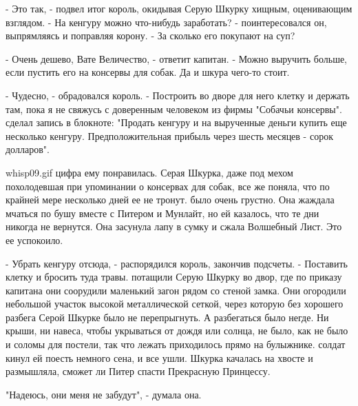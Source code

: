 \par- Это так, - подвел итог король, окидывая Серую Шкурку хищным, 
оценивающим взглядом. - На кенгуру можно что-нибудь заработать? - 
поинтересовался он, выпрямляясь и поправляя корону. - За сколько его 
покупают на суп?
\par- Очень дешево, Вате Величество, - ответит капитан. - Можно 
выручить больше, если пустить его на консервы для собак. Да и шкура 
чего-то стоит.
\par- Чудесно, - обрадовался король. - Построить во дворе для него 
клетку и держать там, пока я не свяжусь с доверенным человеком из 
фирмы "Собачьи консервы".
 сделал запись в блокноте: "Продать кенгуру и на вырученные 
деньги купить еще несколько кенгуру. Предположительная прибыль через 
шесть месяцев - сорок долларов".
\par{whisp09.gif}
 цифра ему понравилась. Серая Шкурка, даже под мехом 
похолодевшая при упоминании о консервах для собак, все же поняла, что 
по крайней мере несколько дней ее не тронут.
 было очень грустно. Она жаждала мчаться по бушу вместе с 
Питером и Мунлайт, но ей казалось, что те дни никогда не вернутся. Она 
засунула лапу в сумку и сжала Волшебный Лист. Это ее успокоило.
\par- Убрать кенгуру отсюда, - распорядился король, закончив подсчеты. 
- Поставить клетку и бросить туда травы.
 потащили Серую Шкурку во двор, где по приказу капитана они 
соорудили маленький загон рядом со стеной замка. Они огородили 
небольшой участок высокой металлической сеткой, через которую без 
хорошего разбега Серой Шкурке было не перепрыгнуть. А разбегаться было 
негде. Ни крыши, ни навеса, чтобы укрываться от дождя или солнца, не 
было, как не было и соломы для постели, так что лежать приходилось 
прямо на булыжнике.
 солдат кинул ей поесть немного сена, и все ушли.
 Шкурка качалась на хвосте и размышляла, сможет ли Питер 
спасти Прекрасную Принцессу.
\par"Надеюсь, они меня не забудут", - думала она.
\par